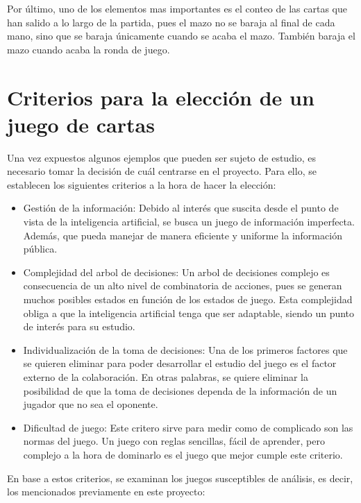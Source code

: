 Por último, uno de los elementos mas importantes es el conteo de las cartas que han salido a lo largo de la partida, pues el mazo no se baraja al final de cada mano, sino que se baraja únicamente cuando se acaba el mazo. También baraja el mazo cuando acaba la ronda de juego.\cite{blackjack}

\section{Criterios para la elección de un juego de cartas}
\label{sec:choices}

Una vez expuestos algunos ejemplos que pueden ser sujeto de estudio, es necesario tomar la decisión de cuál centrarse en el proyecto. Para ello, se establecen los siguientes criterios a la hora de hacer la elección:
\begin{itemize}
\item Gestión de la información: Debido al interés que suscita desde el punto de vista de la inteligencia artificial, se busca un juego de información imperfecta. Además, que pueda manejar de manera eficiente y uniforme la información pública.
\item Complejidad del arbol de decisiones: Un arbol de decisiones complejo es consecuencia de un alto nivel de combinatoria de acciones, pues se generan muchos posibles estados en función de los estados de juego. Esta complejidad obliga a que la inteligencia artificial tenga que ser adaptable, siendo un punto de interés para su estudio. 
\item Individualización de la toma de decisiones: Una de los primeros factores que se quieren eliminar para poder desarrollar el estudio del juego es el factor externo de la colaboración. En otras palabras, se quiere eliminar la posibilidad de que la toma de decisiones dependa de la información de un jugador que no sea el oponente.
\item Dificultad de juego: Este critero sirve para medir como de complicado son las normas del juego. Un juego con reglas sencillas, fácil de aprender, pero complejo a la hora de dominarlo es el juego que mejor cumple este criterio.
\end{itemize} 

En base a estos criterios, se examinan los juegos susceptibles de análisis, es decir, los mencionados previamente en este proyecto:

